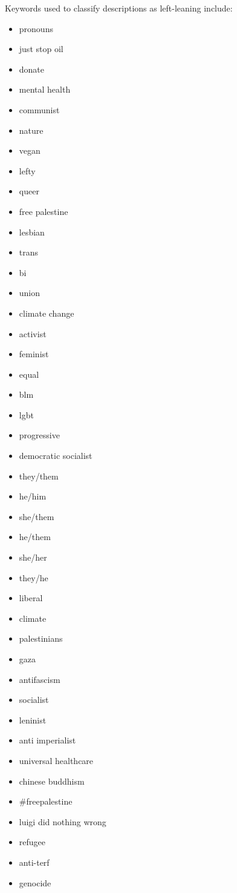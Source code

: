 \documentclass[
	a4paper, %
	12pt, %
	twoside, %
]{LTJournalArticle}
\begin{document}
Keywords used to classify descriptions as left-leaning include:
 \begin{itemize}
    \item pronouns
    \item just stop oil
    \item donate
    \item mental health
    \item communist
    \item nature
    \item vegan
    \item lefty
    \item queer
    \item free palestine
    \item lesbian
    \item trans
    \item bi
    \item union
    \item climate change
    \item activist
    \item feminist
    \item equal
    \item blm
    \item lgbt
    \item progressive
    \item democratic socialist
    \item they/them
    \item he/him
    \item she/them
    \item he/them
    \item she/her
    \item they/he
    \item liberal
    \item climate
    \item palestinians
    \item gaza
    \item antifascism
    \item socialist
    \item leninist
    \item anti imperialist
    \item universal healthcare
    \item chinese buddhism
    \item \#freepalestine
    \item luigi did nothing wrong
    \item refugee
    \item anti-terf
    \item genocide
\end{itemize}


\printbibliography %

\listoffigures
\end{document}

